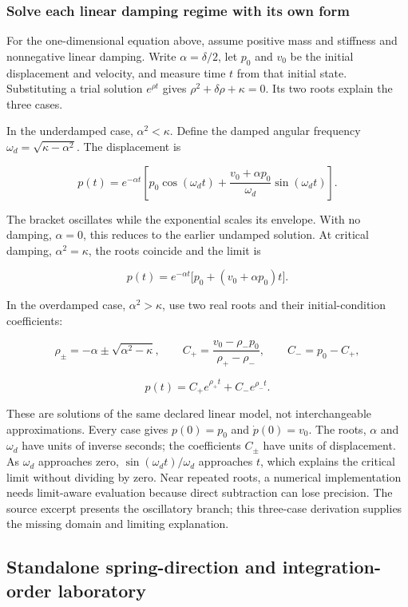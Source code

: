 \subsubsection{Solve each linear damping regime with its own form}\label{06-engine-ii-ch047-solve-each-linear-damping-regime-with-its-own-form}

For the one-dimensional equation above, assume positive mass and stiffness and nonnegative linear damping. Write \(\alpha=\delta/2\), let \(p_0\) and \(v_0\) be the initial displacement and velocity, and measure time \(t\) from that initial state. Substituting a trial solution \(e^{\rho t}\) gives \(\rho^2+\delta\rho+\kappa=0\). Its two roots explain the three cases.

In the underdamped case, \(\alpha^2<\kappa\). Define the damped angular frequency \(\omega_d=\sqrt{\kappa-\alpha^2}\). The displacement is

\[
p(t)=e^{-\alpha t}\left[p_0\cos(\omega_d t)
+\frac{v_0+\alpha p_0}{\omega_d}\sin(\omega_d t)\right].
\]

The bracket oscillates while the exponential scales its envelope. With no damping, \(\alpha=0\), this reduces to the earlier undamped solution. At critical damping, \(\alpha^2=\kappa\), the roots coincide and the limit is

\[
p(t)=e^{-\alpha t}\bigl[p_0+(v_0+\alpha p_0)t\bigr].
\]

In the overdamped case, \(\alpha^2>\kappa\), use two real roots and their initial-condition coefficients:

\[
\rho_\pm=-\alpha\pm\sqrt{\alpha^2-\kappa},\qquad
C_+=\frac{v_0-\rho_-p_0}{\rho_+-\rho_-},\qquad C_-=p_0-C_+,
\]

\[
p(t)=C_+e^{\rho_+t}+C_-e^{\rho_-t}.
\]

These are solutions of the same declared linear model, not interchangeable approximations. Every case gives \(p(0)=p_0\) and \(\dot p(0)=v_0\). The roots, \(\alpha\) and \(\omega_d\) have units of inverse seconds; the coefficients \(C_\pm\) have units of displacement. As \(\omega_d\) approaches zero, \(\sin(\omega_d t)/\omega_d\) approaches \(t\), which explains the critical limit without dividing by zero. Near repeated roots, a numerical implementation needs limit-aware evaluation because direct subtraction can lose precision. The source excerpt presents the oscillatory branch; this three-case derivation supplies the missing domain and limiting explanation.

\subsection{Standalone spring-direction and integration-order laboratory}\label{06-engine-ii-ch047-standalone-spring-direction-and-integration-order-laboratory}

